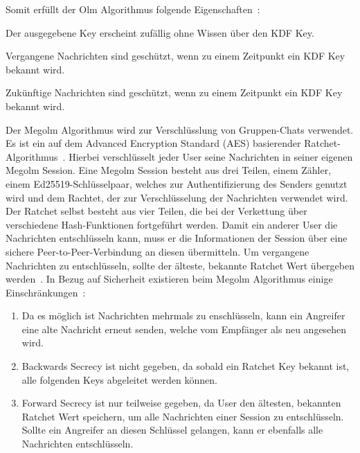     Somit erfüllt der Olm Algorithmus folgende Eigenschaften~\cite{perrin2016double}:
    \begin{description}[leftmargin=!,labelwidth=3.8cm]
        \item [Resilience] Der ausgegebene Key erscheint zufällig ohne Wissen über den KDF Key.
        \item [Forward security] Vergangene Nachrichten sind geschützt, wenn zu einem Zeitpunkt ein KDF Key bekannt wird.
        \item [Break-in recovery] Zukünftige Nachrichten sind geschützt, wenn zu einem Zeitpunkt ein KDF Key bekannt wird.
    \end{description}
    \vspace{0.5cm}
    Der Megolm Algorithmus wird zur Verschlüsslung von Gruppen-Chats verwendet.
    Es ist ein auf dem Advanced Encryption Standard (AES) basierender Ratchet-Algorithmus~\cite{megolm}.
    Hierbei verschlüsselt jeder User seine Nachrichten in seiner eigenen Megolm Session.
    Eine Megolm Session besteht aus drei Teilen, einem Zähler, einem Ed25519-Schlüsselpaar, welches zur Authentifizierung
    des Senders genutzt wird und dem Rachtet, der zur Verschlüsselung der Nachrichten verwendet wird.
    Der Ratchet selbst besteht aus vier Teilen, die bei der Verkettung über verschiedene Hash-Funktionen fortgeführt werden.
    Damit ein anderer User die Nachrichten entschlüsseln kann, muss er die Informationen der Session über eine sichere Peer-to-Peer-Verbindung an diesen übermitteln.
    Um vergangene Nachrichten zu entschlüsseln, sollte der älteste, bekannte Ratchet Wert übergeben werden~\cite{megolm}.
    In Bezug auf Sicherheit existieren beim Megolm Algorithmus einige Einschränkungen~\cite{megolm}:
    \begin{enumerate}
        \item Da es möglich ist Nachrichten mehrmals zu enschlüsseln, kann ein Angreifer eine alte Nachricht erneut senden, welche vom Empfänger als neu angesehen wird.
        \item Backwards Secrecy ist nicht gegeben, da sobald ein Ratchet Key bekannt ist, alle folgenden Keys abgeleitet werden können.
        \item Forward Secrecy ist nur teilweise gegeben, da User den ältesten, bekannten Ratchet Wert speichern, um alle Nachrichten einer Session zu entschlüsseln. Sollte ein Angreifer an diesen Schlüssel gelangen, kann er ebenfalls alle Nachrichten entschlüsseln.
    \end{enumerate}
    \vspace{0.5cm}

